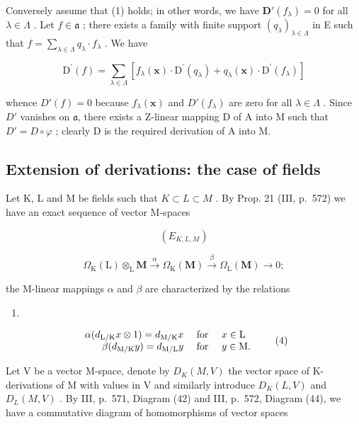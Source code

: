 Conversely assume that (1) holds; in other words, we have \(\mathbf{D}'(f_{\lambda}) = 0\) for all \(\lambda \in \Lambda\) . Let \(f \in \mathfrak{a}\) ; there exists a family with finite support \((q_{\lambda})_{\lambda \in \Lambda}\) in E such that \(f = \sum_{\lambda \in \Lambda} q_{\lambda} \cdot f_{\lambda}\) . We have

\[
\mathrm{D} ^ {\prime} (f) = \sum_ {\lambda \in \Lambda} \left[ f _ {\lambda} (\mathbf {x}) \cdot \mathrm{D} ^ {\prime} (q _ {\lambda}) + q _ {\lambda} (\mathbf {x}) \cdot \mathrm{D} ^ {\prime} (f _ {\lambda}) \right]
\]

whence \(D'(f) = 0\) because \(f_{\lambda}(\mathbf{x})\) and \(D'(f_{\lambda})\) are zero for all \(\lambda \in \Lambda\) . Since \(D'\) vanishes on \(\mathfrak{a}\), there exists a Z-linear mapping D of A into M such that \(D' = D \circ \varphi\) ; clearly D is the required derivation of A into M.

\subsection{Extension of derivations: the case of fields}

Let K, L and M be fields such that \(K \subset L \subset M\) . By Prop. 21 (III, p.~572) we have an exact sequence of vector M-spaces

\[
(E _ {K, L, M})
\]

\[
\Omega_ {\mathrm{K}} (\mathrm{L}) \otimes_ {\mathrm{L}} \mathbf {M} \xrightarrow {\alpha} \Omega_ {\mathrm{K}} (\mathbf {M}) \xrightarrow {\beta} \Omega_ {\mathrm{L}} (\mathbf {M}) \to 0;
\]

the M-linear mappings \(\alpha\) and \(\beta\) are characterized by the relations

\begin{enumerate}
\def\labelenumi{(\arabic{enumi})}
\setcounter{enumi}{2}
\tightlist
\item
\end{enumerate}

\[
\begin{array}{r l} \alpha (d _ {\mathrm{L/K}} x \otimes 1) = d _ {\mathrm{M/K}} x & \text { for } \quad x \in \mathrm{L} \\ \beta (d _ {\mathrm{M/K}} y) = d _ {\mathrm{M/L}} y & \text { for } \quad y \in \mathrm{M}. \end{array}\tag{4}
\]

Let V be a vector M-space, denote by \(D_{K}(M,V)\) the vector space of K-derivations of M with values in V and similarly introduce \(D_{K}(L,V)\) and \(D_{L}(M,V)\) . By III, p.~571, Diagram (42) and III, p.~572, Diagram (44), we have a commutative diagram of homomorphisms of vector spaces

